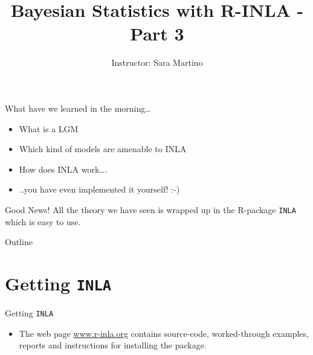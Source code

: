 \documentclass[
  ignorenonframetext,
]{beamer}
\title{Bayesian Statistics with R-INLA - Part 3}
\author{Instructor: Sara Martino}
\date{}
\institute{Department of Mathematical Science (NTNU)}
\providecommand{\tightlist}{%
  \setlength{\itemsep}{0pt}\setlength{\parskip}{0pt}}
\begin{document}
\frame{\titlepage}

\begin{frame}
\end{frame}

\begin{frame}{What have we learned in the morning\ldots{}}
\protect\hypertarget{what-have-we-learned-in-the-morning}{}
\begin{itemize}
\item
  What is a LGM
\item
  Which kind of models are amenable to INLA
\item
  How does INLA work\ldots.
\end{itemize}

\pause

\begin{itemize}
\tightlist
\item
  ..you have even implemented it yourself! :-)
\end{itemize}
\end{frame}

\begin{frame}[fragile]{Good News!}
\protect\hypertarget{good-news}{}
\hfill\break
\hfill\break
\centering All the theory we have seen is wrapped up in the R-package
\texttt{INLA} which is easy to use.
\end{frame}

\begin{frame}{Outline}
\protect\hypertarget{outline}{}
\tableofcontents[hideallsubsections]
\end{frame}

\hypertarget{getting-inla}{%
\section{\texorpdfstring{Getting
\texttt{INLA}}{Getting INLA}}\label{getting-inla}}

\begin{frame}{Getting \texttt{INLA}}
\protect\hypertarget{getting-inla-1}{}
\begin{itemize}
\tightlist
\item
  The web page \textcolor{red}{\url{www.r-inla.org}} contains
  source-code, worked-through examples, reports and instructions for
  installing the package.
\end{itemize}
\end{frame}
\end{document}
